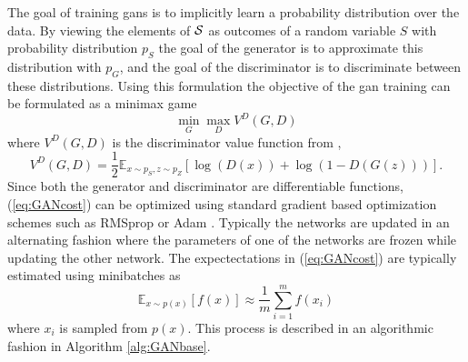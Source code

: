 The goal of training \acrshort{gans} is to implicitly learn a probability distribution over the data. By viewing the elements of $\mathcal{S}$ as outcomes of a random variable $S$ with probability distribution $p_S$ the goal of the generator is to approximate this distribution with $p_G$, and the goal of the discriminator is to discriminate between these distributions. Using this formulation the objective of the \acrshort{gan} training can be formulated as a minimax game 
\begin{equation}
    \min_G \max_D V^{D}(G, D)
\end{equation}
where $V^D(G, D)$ is the discriminator value function from \parencite{goodfellow2016nips},
\begin{equation}
    V^D(G, D) = \frac{1}{2}\mathbb{E}_{x \sim p_S, z \sim p_Z}\left[\log(D(x)) + \log(1 - D(G(z))) \right].
    \label{eq:GANcost}
\end{equation}
Since both the generator and discriminator are differentiable functions, (\ref{eq:GANcost}) can be optimized using standard gradient based optimization schemes such as RMSprop \parencite{tieleman2012lecture} or Adam \parencite{kingma2014adam}. Typically the networks are updated in an alternating fashion where the parameters of one of the networks are frozen while updating the other network. The expectectations in (\ref{eq:GANcost}) are typically estimated using minibatches as 
\begin{equation}
    \mathbb{E}_{x\sim p(x)}[f(x)] \approx \frac{1}{m}\sum_{i=1}^mf(x_i)
\end{equation}
where $x_i$ is sampled from $p(x)$. This process is described in an algorithmic fashion in Algorithm \ref{alg:GANbase}.



